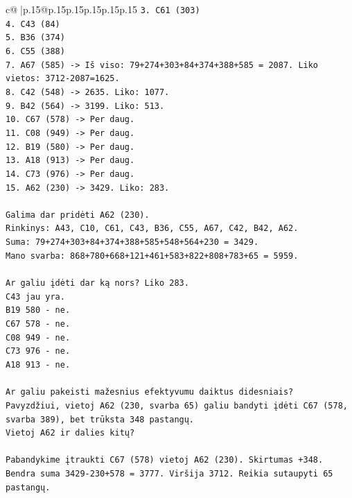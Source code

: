 \documentclass{article}
\begin{document}
{\begin{supertabular}{c@{$\;$}|p{.15\linewidth}@{}p{.15\linewidth}p{.15\linewidth}p{.15\linewidth}p{.15\linewidth}p{.15\linewidth}}
{{{\texttt{3. C61 (303)} \\
\texttt{4. C43 (84)} \\
\texttt{5. B36 (374)} \\
\texttt{6. C55 (388)} \\
\texttt{7. A67 (585) {-}> Iš viso: 79+274+303+84+374+388+585 = 2087. Liko vietos: 3712{-}2087=1625.} \\
\texttt{8. C42 (548) {-}> 2635. Liko: 1077.} \\
\texttt{9. B42 (564) {-}> 3199. Liko: 513.} \\
\texttt{10. C67 (578) {-}> Per daug.} \\
\texttt{11. C08 (949) {-}> Per daug.} \\
\texttt{12. B19 (580) {-}> Per daug.} \\
\texttt{13. A18 (913) {-}> Per daug.} \\
\texttt{14. C73 (976) {-}> Per daug.} \\
\texttt{15. A62 (230) {-}> 3429. Liko: 283.} \\
\\ 
\texttt{Galima dar pridėti A62 (230).} \\
\texttt{Rinkinys: A43, C10, C61, C43, B36, C55, A67, C42, B42, A62.} \\
\texttt{Suma: 79+274+303+84+374+388+585+548+564+230 = 3429.} \\
\texttt{Mano svarba: 868+780+668+121+461+583+822+808+783+65 = 5959.} \\
\\ 
\texttt{Ar galiu įdėti dar ką nors? Liko 283.} \\
\texttt{C43 jau yra.} \\
\texttt{B19 580 {-} ne.} \\
\texttt{C67 578 {-} ne.} \\
\texttt{C08 949 {-} ne.} \\
\texttt{C73 976 {-} ne.} \\
\texttt{A18 913 {-} ne.} \\
\\ 
\texttt{Ar galiu pakeisti mažesnius efektyvumu daiktus didesniais?} \\
\texttt{Pavyzdžiui, vietoj A62 (230, svarba 65) galiu bandyti įdėti C67 (578, svarba 389), bet trūksta 348 pastangų.} \\
\texttt{Vietoj A62 ir dalies kitų?} \\
\\ 
\texttt{Pabandykime įtraukti C67 (578) vietoj A62 (230). Skirtumas +348. Bendra suma 3429{-}230+578 = 3777. Viršija 3712. Reikia sutaupyti 65 pastangų.} \\
}}}
\end{supertabular}}
\end{document}
